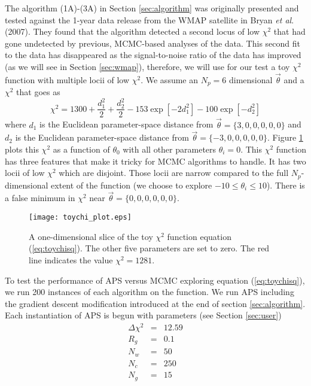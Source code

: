 \documentclass[useAMS,usenatbib]{aastex}
\begin{document}
The algorithm (1A)-(3A) in Section \ref{sec:algorithm} 
was originally presented and tested against the 1-year data
release from the WMAP satellite in Bryan {\it et al}. (2007).  They found that
the algorithm detected a second locus of low $\chi^2$
that had gone undetected by previous, MCMC-based analyses of the data.  
This second fit to the data has disappeared as the signal-to-noise
ratio of the data has improved (as we will see in Section \ref{sec:wmap}),
therefore, we will use for our test a toy $\chi^2$ function
with multiple locii of low $\chi^2$.  We assume an $N_p=6$ dimensional
$\vec{\theta}$ and a $\chi^2$ that goes as
\begin{equation}
\chi^2=1300+\frac{d_1^2}{2}+\frac{d_2^2}{2}-153\exp[-2d_1^2]-100\exp[-d_2^2]
\label{eq:toychisq}
\end{equation}
where $d_1$ is the Euclidean parameter-space distance from 
$\vec{\theta}=\{3,0,0,0,0,0\}$ and
$d_2$ is the Euclidean parameter-space distance from 
$\vec{\theta}=\{-3,0,0,0,0,0\}$.  
Figure \ref{fig:toychisq} plots this $\chi^2$ as a function of $\theta_0$ with
all other parameters $\theta_i=0$.
This $\chi^2$ function has three features that
make it tricky for MCMC algorithms to handle.  It has two locii of low $\chi^2$
which are disjoint.  Those locii are narrow compared to the full
$N_p$-dimensional extent of the function (we choose to explore
$-10\le\theta_i\le10$).  There is a false minimum in $\chi^2$ near
$\vec{\theta}=\{0,0,0,0,0,0\}$.

\begin{figure}
\texttt{[image: toychi\_plot.eps]}
\caption{
A one-dimensional slice of the toy $\chi^2$ function equation
(\ref{eq:toychisq}).  The other five parameters are set to zero.
The red line indicates the value $\chi^2=1281$.
}
\label{fig:toychisq}
\end{figure}

To test the performance of APS versus MCMC exploring equation
(\ref{eq:toychisq}), we run 200 instances of each algorithm on the function.
We run APS including the gradient descent modification introduced at the end of
section \ref{sec:algorithm}.  
Each instantiation of APS is begun with parameters (see Section \ref{sec:user})
\begin{eqnarray}
\Delta\chi^2&=&12.59\nonumber\\
R_g&=&0.1\nonumber\\
N_w&=&50\nonumber\\
N_c&=&250\nonumber\\
N_g&=&15\nonumber
\end{eqnarray}
\end{document}

